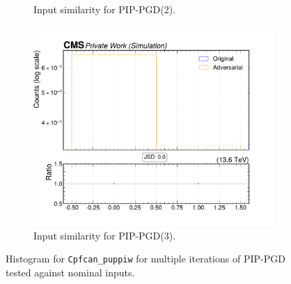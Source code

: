 \begin{figure}[htbp]
\begin{subfigure}[t]{0.32\textwidth}
    \caption*{Input similarity for PIP-PGD(2).}
  \end{subfigure}\hfill
  \begin{subfigure}[t]{0.32\textwidth}
    \includegraphics[width=\linewidth]{media/output/features/compare/combined_it_3/cmp_cpf_arr_Cpfcan_puppiw.pdf}
    \caption*{Input similarity for PIP-PGD(3).}
  \end{subfigure}

  \caption*{Histogram for \texttt{Cpfcan\_puppiw} for multiple iterations of PIP-PGD tested against nominal inputs.}
  \label{fig:combined_input_Cpfcan_puppiw}
\end{figure}

